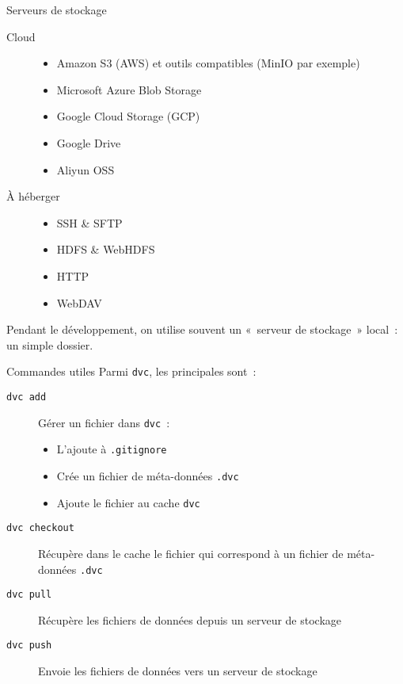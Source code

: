 \begin{frame}{Serveurs de stockage}
  \begin{description}
    \item[Cloud]
      \begin{itemize}
        \item Amazon S3 (AWS) et outils compatibles (MinIO par exemple)
        \item Microsoft Azure Blob Storage
        \item Google Cloud Storage (GCP)
        \item Google Drive
        \item Aliyun OSS
      \end{itemize}
    \item[À héberger]
      \begin{itemize}
        \item SSH \& SFTP
        \item HDFS \& WebHDFS
        \item HTTP
        \item WebDAV
      \end{itemize}
  \end{description}

  Pendant le développement, on utilise souvent un «~serveur de stockage~» local~: un simple dossier.
\end{frame}

\begin{frame}{Commandes utiles}
  Parmi  \texttt{dvc}, les principales sont~:
  \begin{description}
    \item[\texttt{dvc add}] Gérer un fichier dans \texttt{dvc}~:
      \begin{itemize}
        \item L'ajoute à \texttt{.gitignore}
        \item Crée un fichier de méta-données \texttt{.dvc}
        \item Ajoute le fichier au cache \texttt{dvc}
      \end{itemize}
    \item[\texttt{dvc checkout}] Récupère dans le cache le fichier qui correspond à un fichier de méta-données \texttt{.dvc}
    \item[\texttt{dvc pull}] Récupère les fichiers de données depuis un serveur de stockage
    \item[\texttt{dvc push}] Envoie les fichiers de données vers un serveur de stockage
  \end{description}
\end{frame}

